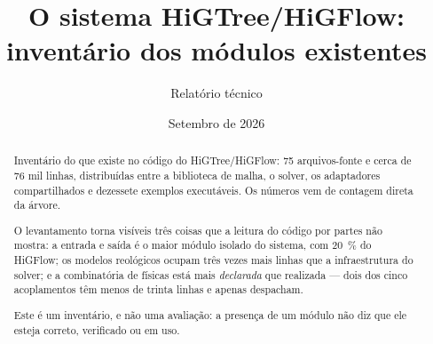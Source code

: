 \documentclass[11pt,a4paper]{article}
\title{O sistema HiGTree/HiGFlow:\\ invent\'ario dos m\'odulos existentes}
\author{Relat\'orio t\'ecnico}
\date{Setembro de 2026}
\begin{document}
\maketitle

\begin{abstract}
Invent\'ario do que existe no c\'odigo do HiGTree/HiGFlow: 75 arquivos-fonte e
cerca de 76 mil linhas, distribu\'idas entre a biblioteca de malha, o solver, os
adaptadores compartilhados e dezessete exemplos execut\'aveis. Os n\'umeros vem
de contagem direta da \'arvore.

O levantamento torna vis\'iveis tr\^es coisas que a leitura do c\'odigo por
partes n\~ao mostra: a entrada e sa\'ida \'e o maior m\'odulo isolado do sistema,
com \SI{20}{\percent} do HiGFlow; os modelos reol\'ogicos ocupam tr\^es vezes
mais linhas que a infraestrutura do solver; e a combinat\'oria de f\'isicas
est\'a mais \emph{declarada} que realizada --- dois dos cinco acoplamentos t\^em
menos de trinta linhas e apenas despacham.

Este \'e um invent\'ario, e n\~ao uma avalia\c{c}\~ao: a presen\c{c}a de um
m\'odulo n\~ao diz que ele esteja correto, verificado ou em uso.
\end{abstract}

\tableofcontents










\end{document}
